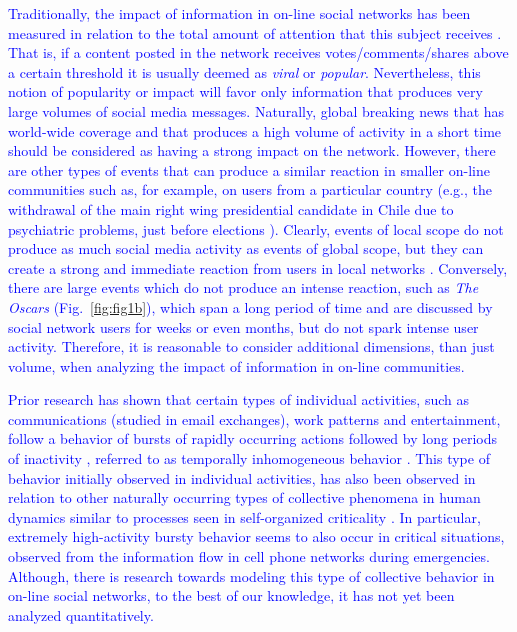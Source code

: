 \documentclass[10pt,letterpaper]{article}
\begin{document}
\textcolor{blue}{Traditionally, the impact of information in on-line social networks has been
measured in relation to the total amount of attention that this subject receives
\cite{berger2012makes,iribarren2011branching,guerini2011exploring,mills2012virality,gaugaz2012predicting}.
That is, if a content posted in the network receives
votes/comments/shares above a certain threshold it is usually deemed as {\em viral} or
{\em popular}. Nevertheless, this
notion of popularity or impact will favor only information that produces very large
volumes of social media messages. 
Naturally, global breaking news that has world-wide coverage and that produces a high volume of
activity in a short time should be considered as
having a strong impact on the network.  However, there are other types of events
that can produce a similar reaction in smaller on-line communities
such as, for example, on users from a particular country
(e.g., the
withdrawal of the main right wing presidential candidate in Chile due
to psychiatric problems, just before
elections \cite{chile_elections}).
Clearly, events of local scope do not produce as much social media
activity as events of global scope, but they can create a strong and
immediate reaction from users in local networks \cite{ReisBOPKA15}. Conversely,
there are large events which do not produce an intense reaction, such as
{\em The Oscars} (Fig.~\ref{fig:fig1b}), which span a long
period of time and are discussed by social network users for weeks or
even months, but do not spark intense user activity. Therefore, it is reasonable to consider additional dimensions,
than just volume, when analyzing the impact of information in on-line communities.}  

\textcolor{blue}{Prior research has shown that certain types of individual activities,
such as communications (studied in email exchanges), work patterns and
entertainment, follow a behavior of bursts of rapidly occurring
actions followed by long periods of inactivity
\cite{barabasi2005origin}, referred to as {temporally inhomogeneous}
behavior \cite{karsai2012universal}.  This type of behavior initially
observed in individual activities, has also been observed in relation
to other naturally occurring types of collective phenomena in human
dynamics similar to processes seen in self-organized criticality
\cite{karsai2012universal}.  In particular, extremely high-activity
bursty behavior seems to also occur in critical situations, observed
from the information flow in cell phone networks during
emergencies\cite{gao2014quantifying}.  Although, there is research
towards modeling this type of collective behavior
\cite{yan2013information} in on-line social networks, to the best of
our knowledge, it has not yet been analyzed quantitatively.}
\end{document}
